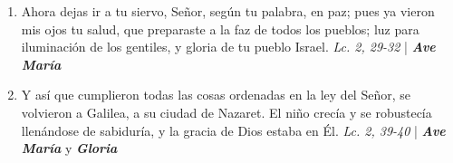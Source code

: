 \documentclass[../../devocionario.tex]{subfiles}
\begin{document}
\begin{enumerate}
        \item Ahora dejas ir a tu siervo, Señor, según tu palabra, en paz; pues ya vieron mis ojos tu salud, 
            que preparaste a la faz de todos los pueblos; luz para iluminación de los gentiles, 
            y gloria de tu pueblo Israel. \textit{Lc. 2, 29-32} | \textbf{\textit{Ave María}}

        \item Y así que cumplieron todas las cosas ordenadas en la ley del Señor, se volvieron a Galilea, a su ciudad de Nazaret. 
            El niño crecía y se robustecía llenándose de sabiduría, 
            y la gracia de Dios estaba en Él. \textit{Lc. 2, 39-40} | \textbf{\textit{Ave María}} y \textbf{\textit{Gloria}}
    
    \end{enumerate}
\end{document}
